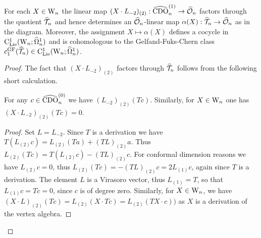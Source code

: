 \begin{prop}\label{prop c1 conformal} For each $X \in {{\rm W}_n}$ the linear map $(X \cdot L_{-2})_{(2)} : \widehat{\rm CDO}_n^{(1)} \to \widehat{\mathcal O}_n$ factors through the quotient $\widehat{\mathcal T}_n$ 
\ben
{}
\een 
and hence determines an $\widehat{\mathcal O}_n$-linear map $\alpha(X) : \widehat{\mathcal T}_n \to \widehat{\mathcal O}_n$ as in the diagram. Moreover, the assignment $X \mapsto \alpha({X})$ defines a cocycle in ${\rm C}_{{\rm Lie}}^1({{\rm W}_n} ; \widehat{\Omega}^1_n)$ and is cohomologous to the Gelfand-Fuks-Chern class $c^{\rm GF}_1(\widehat{\mathcal T}_n) \in {\rm C}_{{\rm Lie}}^1({{\rm W}_n} ; \widehat{\Omega}^1_n)$. 
\end{prop}

\begin{proof}
The fact that $(X \cdot L_{-2})_{(2)}$ factors through $\widehat{\mathcal T}_n$ follows from the following short calculation. 
\begin{lemma} For any $c \in \widehat{\rm CDO}_n^{(0)}$ we have $(L_{-2})_{(2)} (T c)$. Similarly, for $X \in {{\rm W}_n}$ one has $(X \cdot L_{-2})_{(2)}(T c) = 0$. 
\end{lemma}
\begin{proof} Set $L = L_{-2}$. Since $T$ is a derivation we have $T(L_{(2)}c) = L_{(2)}(T a) + (T L)_{(2)} a$. Thus $L_{(2)}(T c) = T(L_{(2)} c) - (T L)_{(2)} c$. For conformal dimension reasons we have $L_{(2)} c = 0$, thus $L_{(2)}(Tc) = -(TL)_{(2)} c = 2 L_{(1)} c$, again since $T$ is a derivation. The element $L$ is a Virasoro vector, thus $L_{(1)} = T$, so that $L_{(1)} c = Tc = 0$, since $c$ is of degree zero. Similarly, for $X \in {{\rm W}_n}$, we have $(X \cdot L)_{(2)} (Tc) = L_{(2)}(X \cdot Tc) = L_{(2)}(T X \cdot c))$ as $X$ is a derivation of the vertex algebra.
\end{proof}


\end{proof}
